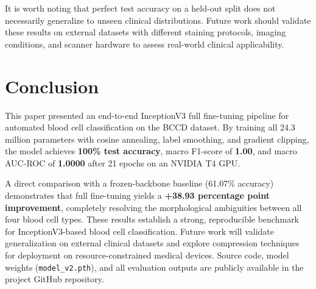 \documentclass[conference]{IEEEtran}
\begin{document}
It is worth noting that perfect test accuracy on a held-out split does not necessarily generalize to unseen clinical distributions. Future work should validate these results on external datasets with different staining protocols, imaging conditions, and scanner hardware to assess real-world clinical applicability.

\section{Conclusion}

This paper presented an end-to-end InceptionV3 full fine-tuning pipeline for automated blood cell classification on the BCCD dataset. By training all 24.3 million parameters with cosine annealing, label smoothing, and gradient clipping, the model achieves \textbf{100\% test accuracy}, macro F1-score of \textbf{1.00}, and macro AUC-ROC of \textbf{1.0000} after 21 epochs on an NVIDIA T4 GPU.

A direct comparison with a frozen-backbone baseline (61.07\% accuracy) demonstrates that full fine-tuning yields a \textbf{+38.93 percentage point improvement}, completely resolving the morphological ambiguities between all four blood cell types. These results establish a strong, reproducible benchmark for InceptionV3-based blood cell classification. Future work will validate generalization on external clinical datasets and explore compression techniques for deployment on resource-constrained medical devices. Source code, model weights (\texttt{model\_v2.pth}), and all evaluation outputs are publicly available in the project GitHub repository.
\end{document}
